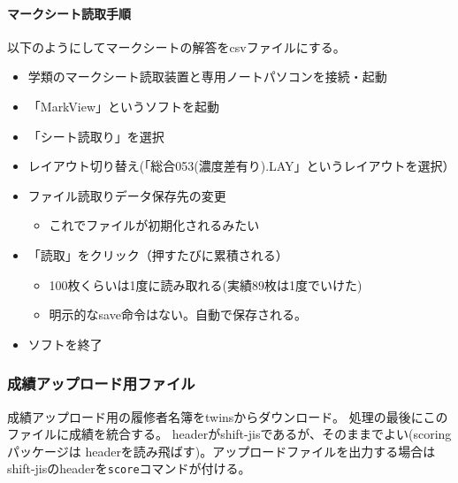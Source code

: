 \paragraph{マークシート読取手順}
\label{マークシート読取手順}

以下のようにしてマークシートの解答をcsvファイルにする。

\begin{itemize}
\item 学類のマークシート読取装置と専用ノートパソコンを接続・起動

\item 「MarkView」というソフトを起動

\item 「シート読取り」を選択

\item レイアウト切り替え(「総合053(濃度差有り).LAY」というレイアウトを選択）

\item ファイル読取りデータ保存先の変更

\begin{itemize}
\item これでファイルが初期化されるみたい

\end{itemize}

\item 「読取」をクリック（押すたびに累積される）

\begin{itemize}
\item 100枚くらいは1度に読み取れる(実績89枚は1度でいけた)

\item 明示的なsave命令はない。自動で保存される。

\end{itemize}

\item ソフトを終了

\end{itemize}

\subsubsection{成績アップロード用ファイル}
\label{成績アップロード用ファイル}

成績アップロード用の履修者名簿をtwinsからダウンロード。
処理の最後にこのファイルに成績を統合する。
headerがshift-jisであるが、そのままでよい(scoringパッケージは
headerを読み飛ばす)。アップロードファイルを出力する場合は
shift-jisのheaderを\texttt{score}コマンドが付ける。

